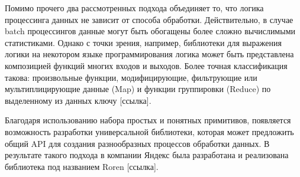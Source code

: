 Помимо прочего два рассмотренных подхода объединяет то, что логика процессинга данных не зависит от способа обработки. Действительно, в случае batch процессингов данные могут быть обогащены более сложно вычислимыми статистиками. Однако с точки зрения, например, библиотеки для выражения логики на некотором языке программирования логика может быть представлена композицией функций многих входов и выходов. Более точная классификация такова: произвольные функции, модифицирующие, фильтрующие или мультиплицирующие данные (Map) и функции группировки (Reduce) по выделенному из данных ключу [ссылка].

Благодаря использованию набора простых и понятных примитивов, появляется возможность разработки универсальной библиотеки, которая может предложить общий API для создания разнообразных процессов обработки данных. В результате такого подхода в компании Яндекс была разработана и реализована библиотека под названием Roren [ссылка].

\newpage


\newpage


\newpage

